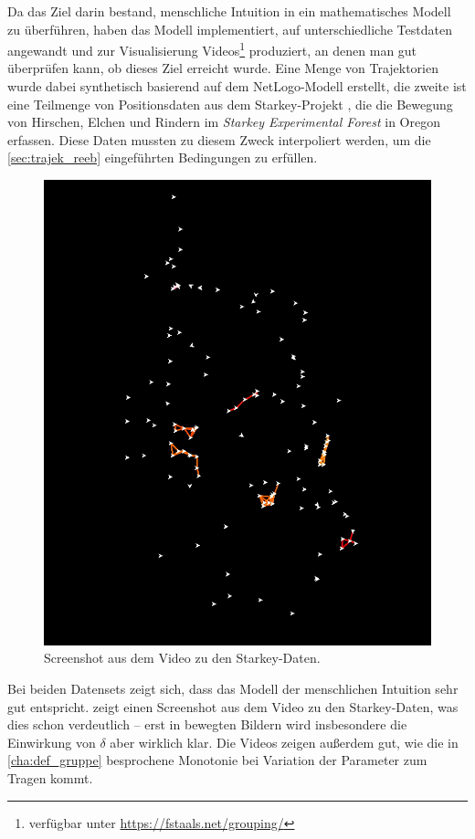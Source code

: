 Da das Ziel darin bestand, menschliche Intuition in ein mathematisches Modell zu überführen, haben \textcite{buchin2015} das Modell implementiert, auf unterschiedliche Testdaten angewandt und zur Visualisierung Videos\footnote{verfügbar unter \url{https://fstaals.net/grouping/}} produziert, an denen man gut überprüfen kann, ob dieses Ziel erreicht wurde.
Eine Menge von Trajektorien wurde dabei synthetisch basierend auf dem NetLogo-Modell  \cite{netlogo} erstellt, die zweite ist eine Teilmenge von Positionsdaten aus dem Starkey-Projekt \cite{starkey}, die die Bewegung von Hirschen, Elchen und Rindern im \emph{Starkey Experimental Forest} in Oregon erfassen. 
Diese Daten mussten zu diesem Zweck interpoliert werden, um die \cref{sec:trajek_reeb} eingeführten Bedingungen zu erfüllen.

\begin{figure}[hbtp]
    \Centering
    \includegraphics[width=.5\textwidth]{videos/starkey.png}
    \caption[Screenshot aus dem Video zu den Starkey-Daten. Quelle: \url{https://fstaals.net/grouping/}]{Screenshot aus dem Video zu den Starkey-Daten.}\label{fig:starkey}
\end{figure}

Bei beiden Datensets zeigt sich, dass das Modell der menschlichen Intuition sehr gut entspricht.
 zeigt einen Screenshot aus dem Video zu den Starkey-Daten, was dies schon verdeutlich -- erst in bewegten Bildern wird insbesondere die Einwirkung von $\delta$ aber wirklich klar.
Die Videos zeigen außerdem gut, wie die in \cref{cha:def_gruppe} besprochene Monotonie bei Variation der Parameter zum Tragen kommt.
